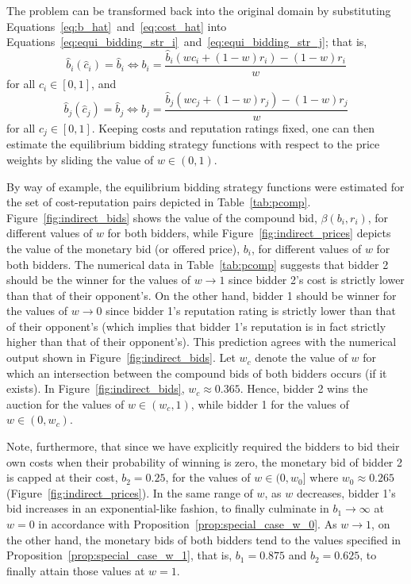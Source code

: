 The problem can be transformed back into the original domain by substituting Equations~\eqref{eq:b_hat}~and~\eqref{eq:cost_hat} into Equations~\eqref{eq:equi_bidding_str_i}~and~\eqref{eq:equi_bidding_str_j}; that is,
\begin{equation*}
  \hat{b}_i(\hat{c}_i) = \hat{b}_i \iff b_i = \displaystyle\frac{\hat{b}_i(wc_i + (1-w)r_i) - (1-w)r_i}{w}
\end{equation*}
for all $c_i\in[0,1]$, and
\begin{equation*}
  \hat{b}_j(\hat{c}_j) = \hat{b}_j \iff b_j = \displaystyle\frac{\hat{b}_j(wc_j + (1-w)r_j) - (1-w)r_j}{w}
\end{equation*}
for all $c_j\in[0,1]$.
Keeping costs and reputation ratings fixed, one can then estimate the equilibrium bidding strategy functions with respect to the price weights by sliding the value of $w\in(0,1)$.

By way of example, the equilibrium bidding strategy functions were estimated for the set of cost-reputation pairs depicted in Table~\ref{tab:pcomp}. Figure~\ref{fig:indirect_bids} shows the value of the compound bid, $\beta(b_i,r_i)$, for different values of $w$ for both bidders, while Figure~\ref{fig:indirect_prices} depicts the value of the monetary bid (or offered price), $b_i$, for different values of $w$ for both bidders. The numerical data in Table~\ref{tab:pcomp} suggests that bidder 2 should be the winner for the values of $w\rightarrow 1$ since bidder 2's cost is strictly lower than that of their opponent's. On the other hand, bidder 1 should be winner for the values of $w\rightarrow 0$ since bidder 1's reputation rating is strictly lower than that of their opponent's (which implies that bidder 1's reputation is in fact strictly higher than that of their opponent's). This prediction agrees with the numerical output shown in Figure~\ref{fig:indirect_bids}. Let $w_c$ denote the value of $w$ for which an intersection between the compound bids of both bidders occurs (if it exists). In Figure~\ref{fig:indirect_bids}, $w_c\approx 0.365$. Hence, bidder 2 wins the auction for the values of $w\in(w_c,1)$, while bidder 1 for the values of $w\in(0,w_c)$.

Note, furthermore, that since we have explicitly required the bidders to bid their own costs when their probability of winning is zero, the monetary bid of bidder 2 is capped at their cost, $b_2 = 0.25$, for the values of $w\in (0, w_0]$ where $w_0\approx 0.265$ (Figure~\ref{fig:indirect_prices}). In the same range of $w$, as $w$ decreases, bidder 1's bid increases in an exponential-like fashion, to finally culminate in $b_1\to\infty$ at $w=0$ in accordance with Proposition~\ref{prop:special_case_w_0}. As $w\to 1$, on the other hand, the monetary bids of both bidders tend to the values specified in Proposition~\ref{prop:special_case_w_1}, that is, $b_1=0.875$ and $b_2=0.625$, to finally attain those values at $w=1$.

